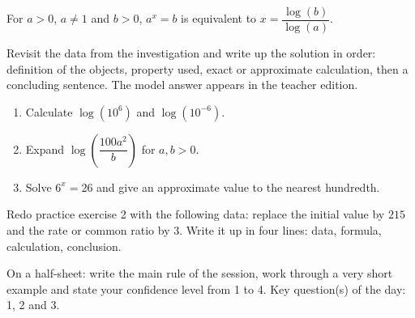 \begin{traceecrite}For $a>0$, $a\neq1$ and $b>0$, $a^x=b$ is equivalent to $x=\dfrac{\log(b)}{\log(a)}$.\end{traceecrite}

\begin{exemple}
Revisit the data from the investigation and write up the solution in order: definition of the objects, property used, exact or approximate calculation, then a concluding sentence. The model answer appears in the teacher edition.
\end{exemple}

\begin{exercice}[-- essential]
\begin{enumerate}\item Calculate $\log(10^6)$ and $\log(10^{-6})$.\item Expand $\log\!\left(\dfrac{100a^2}{b}\right)$ for $a,b>0$.\item Solve $6^x=26$ and give an approximate value to the nearest hundredth.\end{enumerate}
\end{exercice}


\begin{dm}Redo practice exercise 2 with the following data: replace the initial value by $215$ and the rate or common ratio by $3$. Write it up in four lines: data, formula, calculation, conclusion.\end{dm}

\begin{sortie}On a half-sheet: write the main rule of the session, work through a very short example and state your confidence level from 1 to 4. Key question(s) of the day: 1, 2 and 3.\end{sortie}

